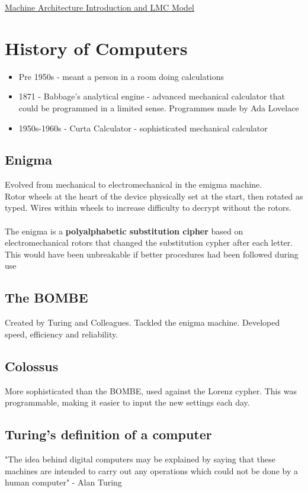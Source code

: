 \documentclass{article}[18pt]
\begin{document}
\begin{center}
\underline{\huge Machine Architecture Introduction and LMC Model}
\end{center}
\section{History of Computers}
\begin{itemize}
\item Pre 1950s - meant a person in a room doing calculations
\item 1871 - Babbage's analytical engine - advanced mechanical calculator that could be programmed in a limited sense. Programmes made by Ada Lovelace
\item 1950s-1960s - Curta Calculator - sophisticated mechanical calculator
\end{itemize}
\subsection{Enigma}
Evolved from mechanical to electromechanical in the emigma machine.\\
Rotor wheels at the heart of the device physically set at the start, then rotated as typed. Wires within wheels to increase difficulty to decrypt without the rotors.\\
\\
The enigma is a \textbf{polyalphabetic substitution cipher} based on electromechanical rotors that changed the substitution cypher after each letter.\\
This would have been unbreakable if better procedures had been followed during use
\subsection{The BOMBE}
Created by Turing and Colleagues. Tackled the enigma machine. Developed speed, efficiency and reliability.
\subsection{Colossus}
More sophisticated than the BOMBE, used against the Lorenz cypher. This was programmable, making it easier to input the new settings each day.
\subsection{Turing's definition of a computer}
\begin{center}
"The idea behind digital computers may be explained by saying that these machines are intended to carry out any operations which could not be done by a human computer" - Alan Turing
\end{center}
\end{document}
